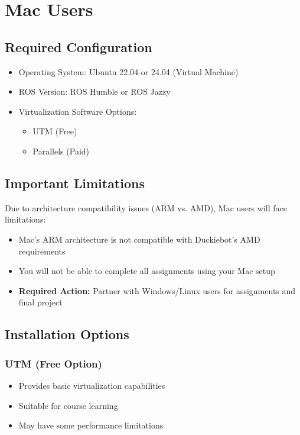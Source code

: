\documentclass{article}
\begin{document}
\section{Mac Users}
\subsection{Required Configuration}
\begin{tcolorbox}[
    title={Options for Mac Users}, colframe=macblue,colback=macblue!10
]
    \begin{itemize}
        \item Operating System: Ubuntu 22.04 or 24.04 (Virtual Machine)
        \item ROS Version: ROS Humble or ROS Jazzy
        \item Virtualization Software Options:
        \begin{itemize}
            \item UTM (Free)
            \item Parallels (Paid)
        \end{itemize}
    \end{itemize}
\end{tcolorbox}

\subsection{Important Limitations}
\begin{tcolorbox}[
    colframe=warningred,
    colback=warningred!5,
    title={\textcolor{warningred}{Critical Information for Mac Users}},
    fonttitle=\bfseries
]
Due to architecture compatibility issues (ARM vs. AMD), Mac users will face limitations:
\begin{itemize}
    \item Mac's ARM architecture is not compatible with Duckiebot's AMD requirements
    \item You will not be able to complete all assignments using your Mac setup
    \item \textbf{Required Action:} Partner with Windows/Linux users for assignments and final project
\end{itemize}
\end{tcolorbox}

\subsection{Installation Options}
\subsubsection{UTM (Free Option)}
\begin{itemize}
    \item Provides basic virtualization capabilities
    \item Suitable for course learning
    \item May have some performance limitations
\end{itemize}
\end{document}
